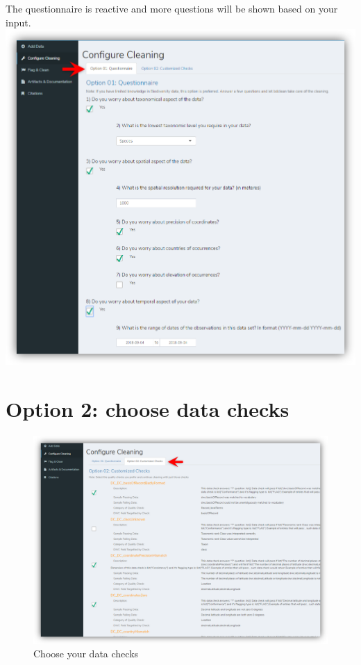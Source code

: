 \documentclass[]{book}
\begin{document}
The questionnaire is reactive and more questions will be shown based on
your input. \includegraphics{img/bdclean_questionnaire-full.png}

\section{Option 2: choose data
checks}\label{option-2-choose-data-checks}

\begin{figure}
\centering
\includegraphics{img/bdclean_data-checks.png}
\caption{Choose your data checks}
\end{figure}
\end{document}
